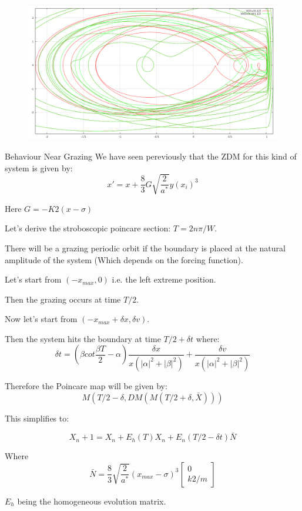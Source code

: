 \documentclass[xcolor=x11names,compress]{beamer}
\renewcommand{\(}{\begin{columns}}
\renewcommand{\)}{\end{columns}}
\newcommand{\<}[1]{\begin{column}{#1}}
\renewcommand{\>}{\end{column}}
\begin{document}
\begin{frame}
\begin{figure}
\begin{center}
\includegraphics[width=0.9\columnwidth]{soft-impact-zoomed}
\end{center}
\end{figure}
\end{frame}




\begin{frame}{Behaviour Near Grazing}
We have seen pereviously that the ZDM for this kind of system is given by:
\[
x'=x+\frac{8}{3}G\sqrt{\frac{2}{a^*}}y(x_i)^3
\]

Here $G=-K2(x-\sigma)$

Let's derive the stroboscopic poincare section:
$T=2n\pi/W. $

There will be a grazing periodic orbit if the boundary is placed at the 
natural amplitude of the system (Which depends on the forcing function). 

Let's start from $(-x_{max},0)$ i.e.  the left extreme position.  

Then the grazing occurs at time $T/2$.  

Now let's start from $(-x_{max}+\delta x,\delta v)$.  

Then the system hits the boundary at time $T/2+\delta t$ where:
\[
\delta t=(\beta cot\frac{\beta T}{2}-\alpha)\frac{\delta x}{x(|\alpha|^2+|\beta|^2)}+\frac{\delta v}{x(|\alpha|^2+|\beta|^2)}
\]
\end{frame}


\begin{frame}
Therefore the Poincare map will be given by:
\[
M(T/2-\delta,DM(M(T/2+\delta,\bar{X})))
\]

This simplifies to:

\[
X_n+1=X_n+E_h(T)X_n+E_n(T/2-\delta t)\bar{N}
\]

Where \[
\bar{N}=\frac{8}{3}\sqrt{\frac{2}{a^*}}(x_{max}-\sigma)^3\begin{bmatrix} 0 
\\k2/m \end{bmatrix}
\]

$E_h$ being the homogeneous evolution matrix.  

\end{frame}
\end{document}
